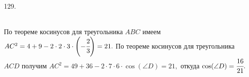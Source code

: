 129. \begin{figure}[ht!]
\end{figure}\\
По теореме косинусов для треугольника $ABC$ имеем $AC^2=4+9-2\cdot2\cdot3\cdot\left(-\cfrac{2}{3}\right)=21.$ По теореме косинусов для треугольника $ACD$ получим $AC^2=49+36-2\cdot7\cdot6\cdot \cos(\angle D)=21,$ откуда $\cos(\angle D)=\cfrac{16}{21}.$\\
